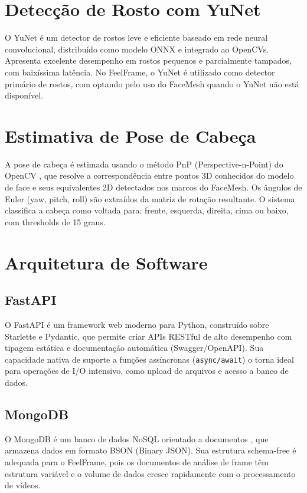 \documentclass[
	12pt,
	openright,
	oneside,
	a4paper,
	english,
	brazil
	]{abntex2}
\begin{document}
\section{Detecção de Rosto com YuNet}

O YuNet \cite{wu2023yunet} é um detector de rostos leve e eficiente baseado em rede neural convolucional, distribuído como modelo ONNX e integrado ao OpenCVs. Apresenta excelente desempenho em rostos pequenos e parcialmente tampados, com baixíssima latência. No FeelFrame, o YuNet é utilizado como detector primário de rostos, com optando pelo uso do FaceMesh quando o YuNet não está disponível.

\section{Estimativa de Pose de Cabeça}

A pose de cabeça é estimada usando o método PnP (Perspective-n-Point) do OpenCV \cite{bradski2000opencv}, que resolve a correspondência entre pontos 3D conhecidos do modelo de face e seus equivalentes 2D detectados nos marcos do FaceMesh. Os ângulos de Euler (yaw, pitch, roll) são extraídos da matriz de rotação resultante. O sistema classifica a cabeça como voltada para: frente, esquerda, direita, cima ou baixo, com thresholds de 15 graus.

\section{Arquitetura de Software}

\subsection{FastAPI}

O FastAPI \cite{fastapi2019} é um framework web moderno para Python, construído sobre Starlette e Pydantic, que permite criar APIs RESTful de alto desempenho com tipagem estática e documentação automática (Swagger/OpenAPI). Sua capacidade nativa de suporte a funções assíncronas (\texttt{async/await}) o torna ideal para operações de I/O intensivo, como upload de arquivos e acesso a banco de dados.

\subsection{MongoDB}

O MongoDB é um banco de dados NoSQL orientado a documentos \cite{mongodb2021}, que armazena dados em formato BSON (Binary JSON). Sua estrutura schema-free é adequada para o FeelFrame, pois os documentos de análise de frame têm estrutura variável e o volume de dados cresce rapidamente com o processamento de vídeos.
\end{document}
